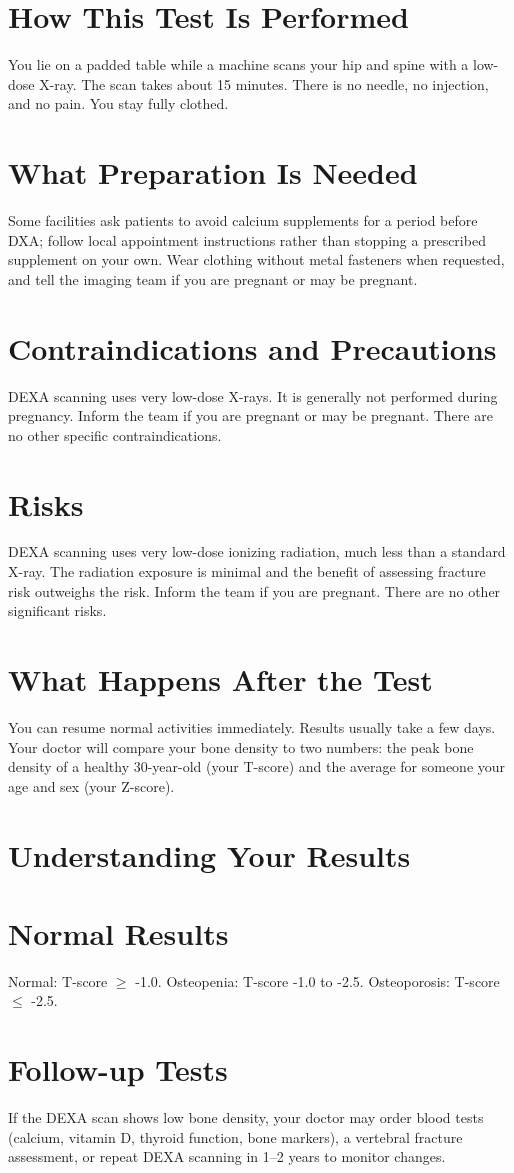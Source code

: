 \section*{How This Test Is Performed}
You lie on a padded table while a machine scans your hip and spine with a low-dose X-ray. The scan takes about 15 minutes. There is no needle, no injection, and no pain. You stay fully clothed.

\section*{What Preparation Is Needed}
Some facilities ask patients to avoid calcium supplements for a period before DXA; follow local appointment instructions rather than stopping a prescribed supplement on your own. Wear clothing without metal fasteners when requested, and tell the imaging team if you are pregnant or may be pregnant.

\section*{Contraindications and Precautions}
DEXA scanning uses very low-dose X-rays. It is generally not performed during pregnancy. Inform the team if you are pregnant or may be pregnant. There are no other specific contraindications.

\section*{Risks}
DEXA scanning uses very low-dose ionizing radiation, much less than a standard X-ray. The radiation exposure is minimal and the benefit of assessing fracture risk outweighs the risk. Inform the team if you are pregnant. There are no other significant risks.

\section*{What Happens After the Test}
You can resume normal activities immediately. Results usually take a few days. Your doctor will compare your bone density to two numbers: the peak bone density of a healthy 30-year-old (your T-score) and the average for someone your age and sex (your Z-score).

\section*{Understanding Your Results}

\section*{Normal Results}
Normal: T-score $\ge$ -1.0. Osteopenia: T-score -1.0 to -2.5. Osteoporosis: T-score $\le$ -2.5.

\section*{Follow-up Tests}
If the DEXA scan shows low bone density, your doctor may order blood tests (calcium, vitamin D, thyroid function, bone markers), a vertebral fracture assessment, or repeat DEXA scanning in 1--2 years to monitor changes.
\clearpage
